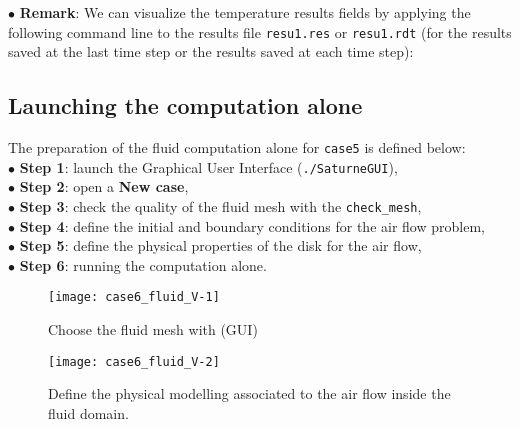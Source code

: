$\bullet$ {\bf Remark}: We can visualize the temperature results fields by applying the following command line
to the results file \texttt{resu1.res} or \texttt{resu1.rdt} (for the results saved at the last time step or the
results saved at each time step):                                   \\
\newpage

\subsection{Launching the \CS computation alone}

The preparation of the fluid computation alone for \texttt{case5} is defined below:\\
$\bullet$ {\bf Step 1}: launch the \CS Graphical User Interface (\texttt{./SaturneGUI}),           \\
$\bullet$ {\bf Step 2}: open a {\bf New case},                                                     \\
$\bullet$ {\bf Step 3}: check the quality of the fluid mesh with the \texttt{check\_mesh},         \\
$\bullet$ {\bf Step 4}: define the initial and boundary conditions for the air flow problem,       \\
$\bullet$ {\bf Step 5}: define the physical properties of the disk for the air flow,               \\
$\bullet$ {\bf Step 6}: running the \CS computation alone.                                         \\

\begin{figure}[h!]
\begin{center}
\texttt{[image: case6\_fluid\_V-1]}
\caption{Choose the fluid mesh with \CS (GUI)}
\label{fig1_e5}
\end{center}
\end{figure}
\newpage

\begin{figure}[h!]
\begin{center}
\texttt{[image: case6\_fluid\_V-2]}
\caption{Define the physical modelling associated to the air flow inside the fluid domain.}
\label{fig1_e5}
\end{center}
\end{figure}

